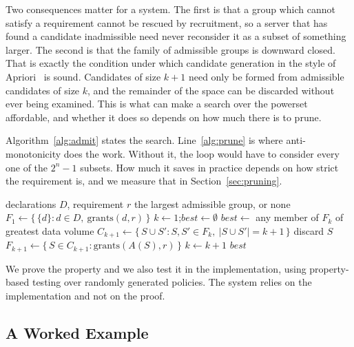 \documentclass[10pt,conference]{IEEEtran}
\begin{document}
Two consequences matter for a system. The first is that a group which cannot
satisfy a requirement cannot be rescued by recruitment, so a server that has
found a candidate inadmissible need never reconsider it as a subset of
something larger. The second is that the family of admissible groups is
downward closed. That is exactly the condition under which candidate generation
in the style of Apriori~\cite{apriori} is sound. Candidates of size $k+1$ need
only be formed from admissible candidates of size $k$, and the remainder of the
space can be discarded without ever being examined. This is what can make a
search over the powerset affordable, and whether it does so depends on how much
there is to prune.

Algorithm~\ref{alg:admit} states the search. Line~\ref{alg:prune} is where
anti-monotonicity does the work. Without it, the loop would have to consider
every one of the $2^{n}-1$ subsets. How much it saves in practice depends on
how strict the requirement is, and we measure that in
Section~\ref{sec:pruning}.

\begin{algorithm}[t]
\caption{Admission by downward-closed search}
\label{alg:admit}
\begin{algorithmic}[1]
\Require declarations $D$, requirement $r$
\Ensure the largest admissible group, or none
\State $F_1 \gets \{\,\{d\} : d \in D,\ \mathrm{grants}(d, r)\,\}$
\State $k \gets 1$;\quad $best \gets \emptyset$
  \State $best \gets$ any member of $F_k$ of greatest data volume
  \State $C_{k+1} \gets \{\,S \cup S' : S, S' \in F_k,\ |S \cup S'| = k+1\,\}$
   \label{alg:prune}
      \State discard $S$ 
    \EndIf
  \EndFor
  \State $F_{k+1} \gets \{\,S \in C_{k+1} : \mathrm{grants}(A(S), r)\,\}$
  \State $k \gets k+1$
\EndWhile
\State \Return $best$
\end{algorithmic}
\end{algorithm}

We prove the property and we also test it in the implementation, using
property-based testing over randomly generated policies. The system relies on
the implementation and not on the proof.

\subsection{A Worked Example}
\label{sec:worked}
\end{document}

